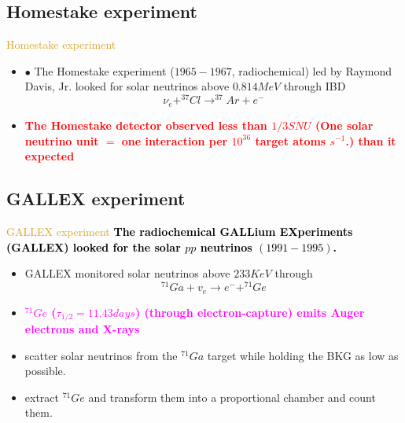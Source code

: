 \documentclass[11pt]{beamer} %
\renewcommand{\(}{\begin{columns}}
\renewcommand{\)}{\end{columns}}
\newcommand{\<}[1]{\begin{column}{#1}}
\renewcommand{\>}{\end{column}}
\newcommand{\itt}{\begin{itemize}}
\newcommand{\tti}{\end{itemize}}
\newcommand{\hlt}[2]{\textcolor{#1}{\textbf{#2}}}
\begin{document}
\subsection{Homestake experiment}
\begin{frame}{\textcolor{Goldenrod}{Homestake experiment}}  
  \itt[<+->]
\item[$\bullet$] The Homestake experiment ($1965-1967$, radiochemical)
  led by Raymond Davis, Jr. 
  looked for solar neutrinos above $0.814 MeV$ through IBD
  \[
    \nu_e + ^{37}Cl \to ^{37}Ar + e^- 
  \]

\item \hlt{Red}{The Homestake detector observed less than $1/3 SNU$
    (One solar neutrino unit $=$ one interaction per $10^{36}$ target atoms
    $s^{-1}$.) than it expected}
  
  \tti  
\end{frame}


\subsection{GALLEX experiment}
\begin{frame}{\textcolor{Goldenrod}{GALLEX experiment}}
  \hlt{black}{The radiochemical GALLium EXperiments (GALLEX) looked
    for the solar $pp$ neutrinos $(1991-1995)$.}
  \itt
\item GALLEX monitored solar neutrinos above $233 KeV$ through
  \[
    ^{71}Ga + v_e \to e^- + ^{71}Ge
  \]
\item<2-> \hlt{Magenta}{$^{71}Ge$ ($\tau_{1/2} = 11.43 days$) (through electron-capture)
  emits Auger electrons and X-rays }
\item<3-> scatter solar neutrinos from the $^{71}Ga$ target while holding
  the BKG as low as possible.
\item<3-> extract $^{71}Ge$ and transform them into a proportional chamber
  and count them.  
\tti
\end{frame}  
\end{document}
